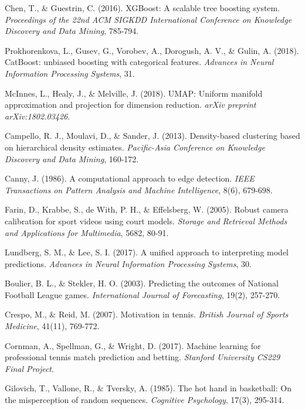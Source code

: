 \documentclass[11pt,a4paper]{article}
\begin{document}
\begin{thebibliography}{99}
Chen, T., \& Guestrin, C. (2016). XGBoost: A scalable tree boosting system. \textit{Proceedings of the 22nd ACM SIGKDD International Conference on Knowledge Discovery and Data Mining}, 785-794.

Prokhorenkova, L., Gusev, G., Vorobev, A., Dorogush, A. V., \& Gulin, A. (2018). CatBoost: unbiased boosting with categorical features. \textit{Advances in Neural Information Processing Systems}, 31.

McInnes, L., Healy, J., \& Melville, J. (2018). UMAP: Uniform manifold approximation and projection for dimension reduction. \textit{arXiv preprint arXiv:1802.03426}.

Campello, R. J., Moulavi, D., \& Sander, J. (2013). Density-based clustering based on hierarchical density estimates. \textit{Pacific-Asia Conference on Knowledge Discovery and Data Mining}, 160-172.

Canny, J. (1986). A computational approach to edge detection. \textit{IEEE Transactions on Pattern Analysis and Machine Intelligence}, 8(6), 679-698.

Farin, D., Krabbe, S., de With, P. H., \& Effelsberg, W. (2005). Robust camera calibration for sport videos using court models. \textit{Storage and Retrieval Methods and Applications for Multimedia}, 5682, 80-91.

Lundberg, S. M., \& Lee, S. I. (2017). A unified approach to interpreting model predictions. \textit{Advances in Neural Information Processing Systems}, 30.

Boulier, B. L., \& Stekler, H. O. (2003). Predicting the outcomes of National Football League games. \textit{International Journal of Forecasting}, 19(2), 257-270.

Crespo, M., \& Reid, M. (2007). Motivation in tennis. \textit{British Journal of Sports Medicine}, 41(11), 769-772.

Cornman, A., Spellman, G., \& Wright, D. (2017). Machine learning for professional tennis match prediction and betting. \textit{Stanford University CS229 Final Project}.

Gilovich, T., Vallone, R., \& Tversky, A. (1985). The hot hand in basketball: On the misperception of random sequences. \textit{Cognitive Psychology}, 17(3), 295-314.


\end{thebibliography}
\end{document}
